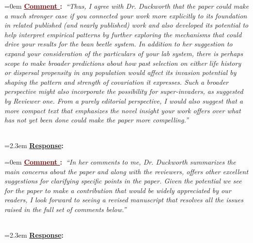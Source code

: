 \documentclass[12pt]{article}
\newcounter{cN}
\newcommand{\comment}[1]{
	\vspace{2em} 
	\refstepcounter{cN} %
	\noindent \hangindent=0em \textbf{\textcolor{Maroon}{\uline{Comment \thecN}:~}}\emph{``#1''}
	}
\newcommand{\response}[1]{
	\\[0.25em] 
	\hangindent=2.3em \textbf{\textcolor{NavyBlue}{\uline{Response}:~}}#1 
	}
\begin{document}
\comment{Thus, I agree with Dr. Duckworth that the paper could make a much stronger case if you connected your work more explicitly to its foundation in related published (and nearly published) work and also developed its potential to help interpret empirical patterns by further exploring the mechanisms that could drive your results for the bean beetle system.
In addition to her suggestion to expand your consideration of the particulars of your lab system, there is perhaps scope to make broader predictions about how past selection on either life history or dispersal propensity in any population would affect its invasion potential by shaping the pattern and strength of covariation it expresses. 
Such a broader perspective might also incorporate the possibility for super-invaders, as suggested by Reviewer one. 
From a purely editorial perspective, I would also suggest that a more compact text that emphasizes the novel insight your work offers over what has not yet been done could make the paper more compelling.}
\response{}

\comment{In her comments to me, Dr. Duckworth summarizes the main concerns about the paper and along with the reviewers, offers other excellent suggestions for clarifying specific points in the paper. 
Given the potential we see for the paper to make a contribution that would be widely appreciated by our readers, I look forward to seeing a revised manuscript that resolves all the issues raised in the full set of comments below.}
\response{}


%
%


\end{document}
